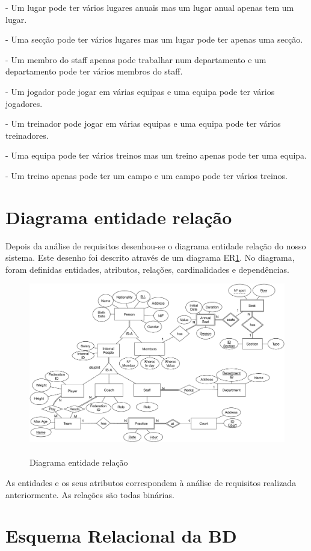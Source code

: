 \documentclass[pdftex,12pt,a4paper]{report}
\begin{document}
- Um lugar pode ter vários lugares anuais mas um lugar anual apenas tem um lugar.

- Uma secção pode ter vários lugares mas um lugar pode ter apenas uma secção.

- Um membro do staff apenas pode trabalhar num departamento e um departamento pode ter vários membros do staff.

- Um jogador pode jogar em várias equipas e uma equipa pode ter vários jogadores.

- Um treinador pode jogar em várias equipas e uma equipa pode ter vários treinadores.

- Uma equipa pode ter vários treinos mas um treino apenas pode ter uma equipa.

- Um treino apenas pode ter um campo e um campo pode ter vários treinos.

\newpage
\section{Diagrama entidade relação}
Depois da análise de requisitos desenhou-se o diagrama entidade relação do nosso sistema. Este desenho foi descrito através de um diagrama ER\ref{fig:eer}. No diagrama, foram definidas entidades, atributos, relações, cardinalidades e dependências.

\begin{figure}[!htb]
 \includegraphics[width=135mm,scale=1]{EER.pdf}
 \caption{\\Diagrama entidade relação}\label{fig:eer}
\end{figure}

As entidades e os seus atributos correspondem à análise de requisitos realizada anteriormente. As relações são todas binárias.

\newpage
\section{Esquema Relacional da BD}
\end{document}
